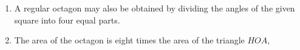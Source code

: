 \begin{enumerate}
    \item A regular octagon may also be obtained by dividing the angles of the
        given square into four equal parts.


%
%
%
%
%
%
%
%
%
%
%
%
%
%
%
%
\item The area of the octagon is eight times the area of the triangle $HOA$,
%
%
%
%
%
%
%
%
%
%
%
%
%
\end{enumerate}


